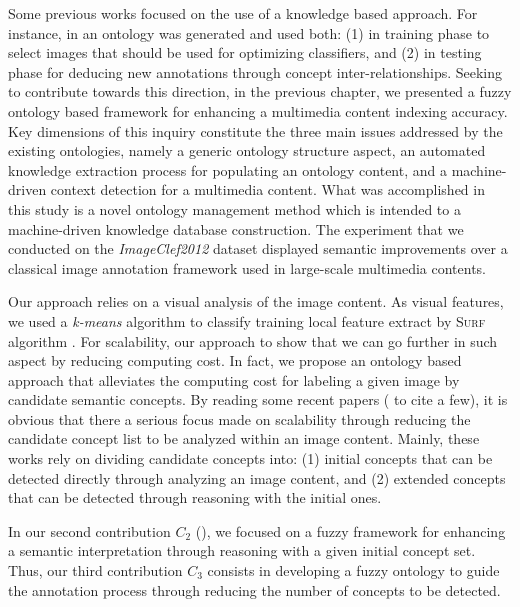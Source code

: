 		Some previous works focused on the use of a knowledge based approach. For instance, 
		in \citep{Reshma2014} an ontology was generated and used both: (1) in training phase 
		to select images that should be used for optimizing classifiers, and (2) in testing 
		phase for deducing new annotations through concept inter-relationships.
		Seeking to contribute towards this direction, in the previous chapter, we presented a fuzzy 
		ontology based framework for enhancing a multimedia content indexing accuracy. 
		Key dimensions of this inquiry constitute the three main issues addressed by the existing 
		ontologies, namely a generic ontology structure aspect, an automated knowledge extraction 
		process for populating an ontology content, and a machine-driven context detection for 
		a multimedia content. What was accomplished in this study is a novel ontology management 
		method which is intended to a machine-driven knowledge database construction. 
		The experiment that we conducted on the \textit{ImageClef2012} dataset displayed 
		semantic improvements over a classical image annotation framework used in 
		large-scale multimedia contents.

		Our approach relies on a visual analysis of the image content. As visual features, 
		we used a \emph{k-means} \citep{Sculley2010} algorithm to classify training 
		local feature extract by \textsc{Surf} algorithm \citep{Bay2008}. For scalability, 
		our approach  to show that we can go further in such aspect by reducing computing cost. 
		In fact, we propose an ontology based approach that alleviates the computing cost for 
		labeling a given image by candidate semantic concepts. By reading some recent papers  
		(\citep{Mller2010,Villegas2013,Villegas2014,Cappellato2015,Villegas2015} to cite a few), 
		it is obvious that there  a serious focus made on scalability through reducing
		the candidate concept list to be analyzed within an image content. Mainly, these works
		rely on dividing candidate concepts into: (1) initial concepts that can be detected directly 
		through analyzing an image content, and (2) extended concepts that can be detected through 
		reasoning with the initial ones. 

		In our second contribution $C_{2}$ (\citep{Zarka2015}), we focused on a fuzzy framework 
		for enhancing a semantic interpretation through reasoning with a given initial concept set.
		Thus, our third contribution $C_{3}$ consists in developing a fuzzy ontology to guide the
		annotation process through reducing the number of concepts to be detected.
 




